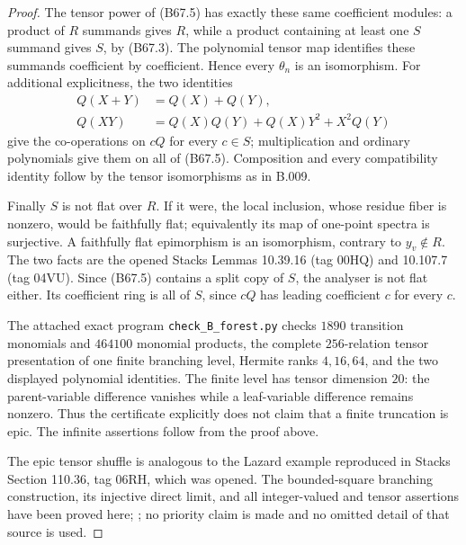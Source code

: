 \begin{proof}
The tensor power of (B67.5) has exactly these
same coefficient modules: a product of $R$
summands gives $R$, while a product containing
at least one $S$ summand gives $S$, by (B67.3).
The polynomial tensor map identifies these
summands coefficient by coefficient. Hence
every $\theta_n$ is an isomorphism.
For additional explicitness, the two identities
\[
\begin{aligned}
 Q(X+Y)&=Q(X)+Q(Y),\\
 Q(XY)&=Q(X)Q(Y)+Q(X)Y^2+X^2Q(Y)
\end{aligned}
\]
give the co-operations on $cQ$ for every
$c\in S$; multiplication and ordinary
polynomials give them on all of (B67.5).
Composition and every compatibility identity
follow by the tensor isomorphisms as in B.009.

Finally $S$ is not flat over $R$. If it were,
the local inclusion, whose residue fiber is
nonzero, would be faithfully flat; equivalently
its map of one-point spectra is surjective.
A faithfully flat epimorphism is an isomorphism,
contrary to $y_v\notin R$. The two facts are
the opened Stacks Lemmas 10.39.16 (tag 00HQ)
and 10.107.7 (tag 04VU). Since (B67.5)
contains a split copy of $S$, the analyser
is not flat either. Its coefficient ring is
all of $S$, since $cQ$ has leading coefficient
$c$ for every $c$.

The attached exact program \texttt{check\_B\_forest.py}
checks $1890$ transition monomials and $464100$
monomial products, the complete $256$-relation
tensor presentation of one finite branching level,
Hermite ranks $4,16,64$, and the two displayed
polynomial identities. The finite level has tensor
dimension $20$: the parent-variable difference
vanishes while a leaf-variable difference remains
nonzero. Thus the certificate explicitly does
not claim that a finite truncation is epic.
The infinite assertions follow from the proof above.

The epic tensor shuffle is analogous to the
Lazard example reproduced in Stacks Section
110.36, tag 06RH, which was opened. The
bounded-square branching construction, its
injective direct limit, and all integer-valued
and tensor assertions have been proved here;
\cite{StacksEpicExamples}; no priority claim is made and no omitted
detail of that source is used.
\end{proof}
